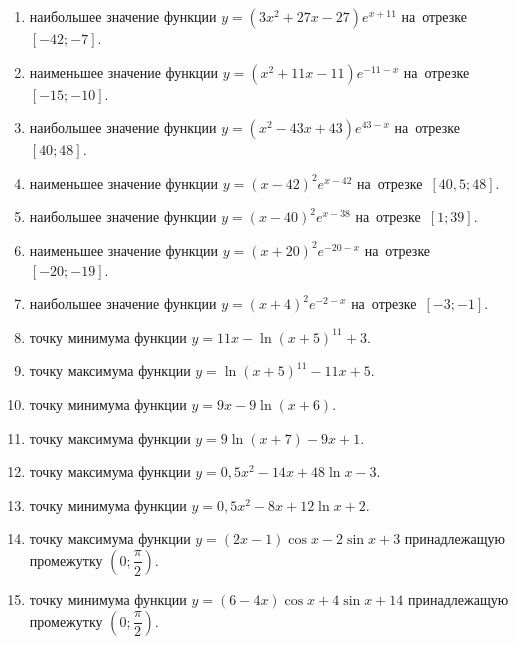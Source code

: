 \documentclass[a4paper,10pt]{article}
\begin{document}
\begin{enumerate}
\item {} наибольшее значение функции $y=\left(3x^2 +27x -27\right)e^{x+11}$ на~отрезке~$\left[-42;-7\right]$.

\item {} наименьшее значение функции $y=\left(x^2 +11x -11\right)e^{-11-x}$ на~отрезке~$\left[-15;-10\right]$.

\item {} наибольшее значение функции $y=\left(x^2 -43x +43\right)e^{43-x}$ на~отрезке~$\left[40;48\right]$.

\item {} наименьшее значение функции $y=\left(x-42\right)^2e^{x-42}$ на~отрезке~$\left[40,5;48\right]$.

\item {} наибольшее значение функции $y=\left(x-40\right)^2e^{x-38}$ на~отрезке~$\left[1;39\right]$.

\item {} наименьшее значение функции $y=\left(x+20\right)^2e^{-20-x}$ на~отрезке~$\left[-20;-19\right]$.

\item {} наибольшее значение функции $y=\left(x+4\right)^2e^{-2-x}$ на~отрезке~$\left[-3;-1\right]$.

\item {} точку минимума функции $y=11x-\ln\left(x+5\right)^{11}+3$.

\item {} точку максимума функции $y=\ln\left(x+5\right)^{11}-11x+5$.

\item {} точку минимума функции $y=9x-9\ln\left(x+6\right)$.

\item {} точку максимума функции $y=9\ln\left(x+7\right)-9x+1$.

\item {} точку максимума функции $y=0,5x^2-14x+48\ln x -3$.

\item {} точку минимума функции $y=0,5x^2-8x+12\ln x +2$.

\item {} точку максимума функции $y=\left(2x-1\right)\cos x -2\sin x+3$
принадлежащую промежутку $\left(0;\dfrac{\pi}{2}\right)$.

\item {} точку минимума функции $y=\left(6-4x\right)\cos x +4\sin x+14$
принадлежащую промежутку $\left(0;\dfrac{\pi}{2}\right)$.


\end{enumerate}
\end{document}
